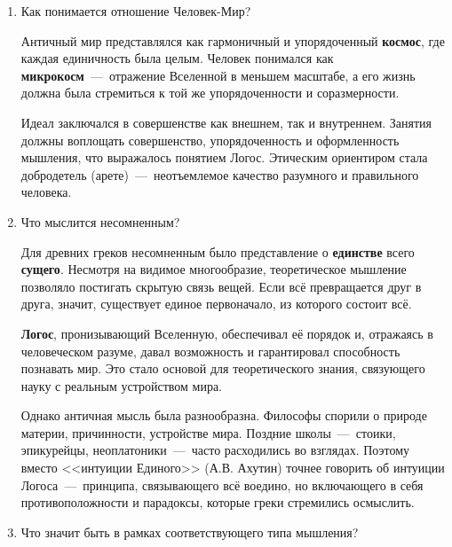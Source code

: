 \begin{enumerate}
    \item Как понимается отношение Человек-Мир?

Античный мир представлялся как гармоничный и упорядоченный \textbf{космос}, где каждая единичность была целым. Человек понимался как \textbf{микрокосм}~---~отражение Вселенной в меньшем масштабе, а его жизнь должна была стремиться к той же упорядоченности и соразмерности.

Идеал заключался в совершенстве как внешнем, так и внутреннем. Занятия должны воплощать совершенство, упорядоченность и оформленность мышления, что выражалось понятием Логос. Этическим ориентиром стала добродетель (арете)~---~неотъемлемое качество разумного и правильного человека.


\item Что мыслится несомненным?

Для древних греков несомненным было представление о \textbf{единстве} всего \textbf{сущего}. Несмотря на видимое многообразие, теоретическое мышление позволяло постигать скрытую связь вещей. Если всё превращается друг в друга, значит, существует единое первоначало, из которого состоит всё.

\textbf{Логос}, пронизывающий Вселенную, обеспечивал её порядок и, отражаясь в человеческом разуме, давал возможность и гарантировал способность познавать мир. Это стало основой для теоретического знания, связующего науку с реальным устройством мира.

Однако античная мысль была разнообразна. Философы спорили о природе материи, причинности, устройстве мира. Поздние школы~---~стоики, эпикурейцы, неоплатоники~---~часто расходились во взглядах. Поэтому вместо <<интуиции Единого>> (А.В. Ахутин) точнее говорить об интуиции Логоса~---~принципа, связывающего всё воедино, но включающего в себя противоположности и парадоксы, которые греки стремились осмыслить.

\item Что значит быть в рамках соответствующего типа мышления?



\end{enumerate}
